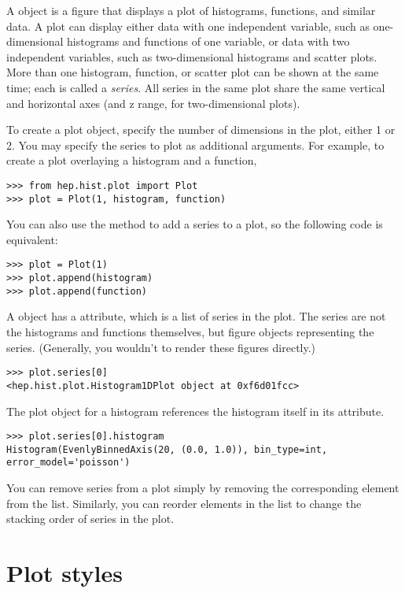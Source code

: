 A  object is a figure that displays a plot of
histograms, functions, and similar data.  A plot can display either data
with one independent variable, such as one-dimensional histograms and
functions of one variable, or data with two independent variables, such
as two-dimensional histograms and scatter plots.  More than one
histogram, function, or scatter plot can be shown at the same time; each
is called a \textit{series}.  All series in the same plot share the same
vertical and horizontal axes (and z range, for two-dimensional plots).

To create a plot object, specify the number of dimensions in the plot,
either 1 or 2.  You may specify the series to plot as additional
arguments.  For example, to create a plot overlaying a histogram and a
function,
\begin{verbatim}
>>> from hep.hist.plot import Plot
>>> plot = Plot(1, histogram, function)
\end{verbatim}
You can also use the  method to add a series to a plot,
so the following code is equivalent:
\begin{verbatim}
>>> plot = Plot(1)
>>> plot.append(histogram)
>>> plot.append(function)
\end{verbatim}

A  object has a  attribute, which is a list
of series in the plot.  The series are not the histograms and functions
themselves, but figure objects representing the series.  (Generally, you
wouldn't to render these figures directly.)  
\begin{verbatim}
>>> plot.series[0]
<hep.hist.plot.Histogram1DPlot object at 0xf6d01fcc>
\end{verbatim}
The plot object for a histogram references the histogram itself in its
 attribute.
\begin{verbatim}
>>> plot.series[0].histogram
Histogram(EvenlyBinnedAxis(20, (0.0, 1.0)), bin_type=int, error_model='poisson')
\end{verbatim}

You can remove series from a plot simply by removing the corresponding
element from the  list.  Similarly, you can reorder
elements in the list to change the stacking order of series in the
plot. 


\section{Plot styles}

